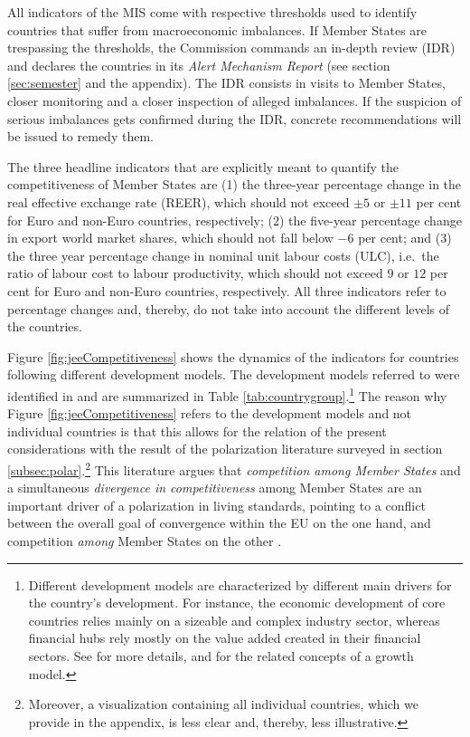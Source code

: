 \documentclass[
]{article}
\begin{document}
All indicators of the MIS come with respective thresholds
used to identify countries that suffer from macroeconomic imbalances.
If Member States are trespassing the thresholds, the Commission commands an
in-depth review (IDR) and declares the countries in its \emph{Alert Mechanism Report}
(see section \ref{sec:semester} and the appendix).
The IDR consists in visits to Member States, closer monitoring and
a closer inspection of alleged imbalances. If the suspicion of serious imbalances
gets confirmed during the IDR, concrete recommendations will be issued to remedy
them.

The three headline indicators that are explicitly meant to
quantify the competitiveness of Member States are
(1) the three-year percentage change in the real effective exchange rate (REER),
which should not exceed \(\pm5\) or \(\pm11\) per cent for Euro and non-Euro countries,
respectively;
(2) the five-year percentage change in export world market shares, which should
not fall below \(-6\) per cent;
and (3) the three year percentage change in nominal unit labour costs (ULC),
i.e.~the ratio of labour cost to labour productivity, which should not exceed
\(9\) or \(12\) per cent for Euro and non-Euro countries, respectively.
All three indicators refer to percentage changes and, thereby, do not take into
account the different levels of the countries.

Figure \ref{fig:jeeCompetitiveness} shows the dynamics of the indicators
for countries following different development models. The development models
referred to were identified in \citet{Graebner:2020jee} and are summarized in
Table \ref{tab:countrygroup}.\footnote{Different development models are characterized by different main drivers
  for the country's development. For instance, the economic development of
  core countries relies mainly on a sizeable and complex industry sector,
  whereas financial hubs rely mostly on the value added created in their
  financial sectors. See \citet{Graebner:2020jee}
  for more details, and \citet{Baccaro.2016} for the related concepts of
  a growth model.}
The reason why Figure \ref{fig:jeeCompetitiveness} refers to the development
models and not individual countries is that this allows for the relation of
the present considerations with the result of the
polarization literature surveyed in section \ref{subsec:polar}.\footnote{Moreover, a visualization containing all individual countries, which we
  provide in the appendix, is less clear and, thereby, less illustrative.} This literature argues that \emph{competition among Member States} and a simultaneous
\emph{divergence in competitiveness} among Member States are an
important driver of a polarization in living standards, pointing to a conflict
between the overall goal of convergence within the EU on the one hand, and
competition \emph{among} Member States on the other \citep[e.g.][]{Kapeller:2019cds}.
\end{document}
